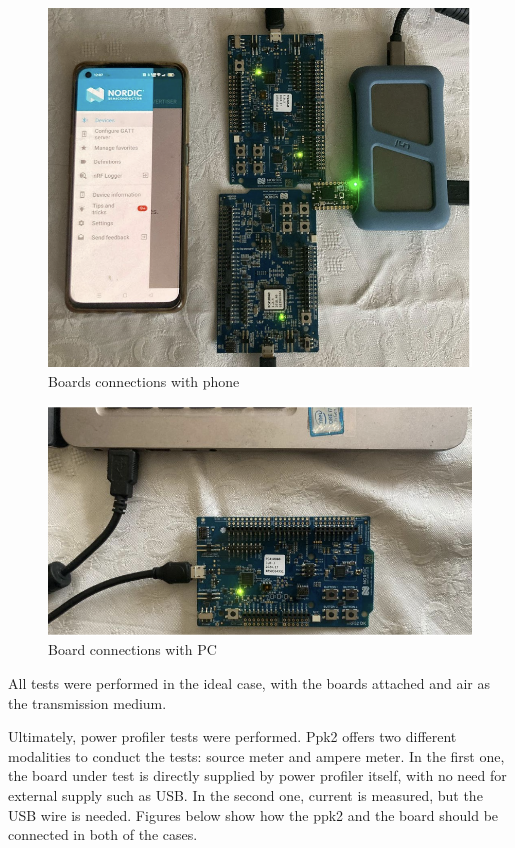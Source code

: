 \documentclass{Configuration_Files/PoliMi3i_thesis}
\begin{document}
\begin{figure}[H]
    \centering
    \includegraphics[scale=0.6]{Test_Procedure/6.png}
    \caption{Boards connections with phone}
    \label{multicentral_implementation_6}
\end{figure}

\begin{figure}[H]
    \centering
    \includegraphics[scale=0.6]{Test_Procedure/7.png}
    \caption{Board connections with PC}
    \label{direct_communication_board_PC_7}
\end{figure}


All tests were performed in the ideal case, with the boards attached and air as the transmission medium.

Ultimately, power profiler tests were performed. Ppk2 offers two different modalities to conduct the tests: source meter and ampere meter. In the first one, the board under test is directly supplied by power profiler itself, with no need for external supply such as USB. In the second one, current is measured, but the USB wire is needed.
Figures below show how the ppk2 and the board should be connected in both of the cases.
\end{document}

